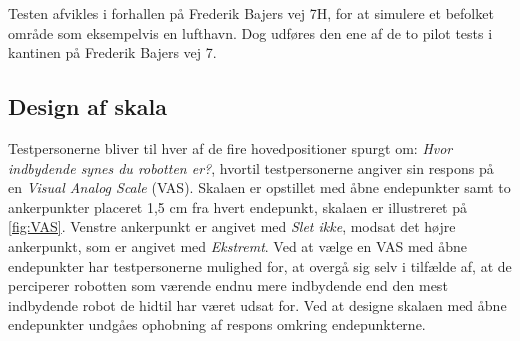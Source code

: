 \noindent
%
Testen afvikles i forhallen på Frederik Bajers vej 7H, for at simulere et befolket område som eksempelvis en lufthavn. Dog udføres den ene af de to pilot tests i kantinen på Frederik Bajers vej 7.
%

\subsection*{Design af skala}
%
Testpersonerne bliver til hver af de fire hovedpositioner spurgt om: \textit{Hvor indbydende synes du robotten er?}, hvortil testpersonerne angiver sin respons på en \textit{Visual Analog Scale} (VAS). Skalaen er opstillet med åbne endepunkter samt to ankerpunkter placeret 1,5 cm fra hvert endepunkt, skalaen er illustreret på \autoref{fig:VAS}. Venstre ankerpunkt er angivet med \textit{Slet ikke}, modsat det højre ankerpunkt, som er angivet med \textit{Ekstremt}. Ved at vælge en VAS med åbne endepunkter har testpersonerne mulighed for, at overgå sig selv i tilfælde af, at de perciperer robotten som værende endnu mere indbydende end den mest indbydende robot de hidtil har været udsat for. Ved at designe skalaen med åbne endepunkter undgåes ophobning af respons omkring endepunkterne. 
%
%











